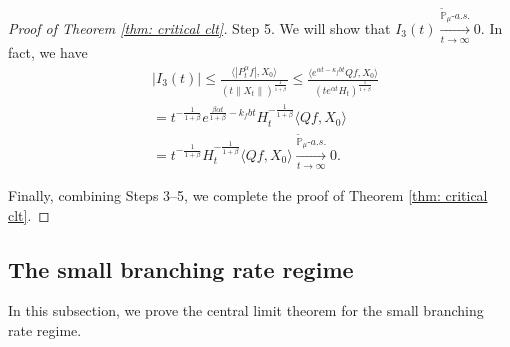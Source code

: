 \documentclass[12pt,a4paper]{amsart}
\theoremstyle{plain}
\theoremstyle{definition}
\numberwithin{equation}{section}
\begin{document}
\begin{proof}[Proof of Theorem \ref{thm: critical clt}]
	Step 5.
    We will show that $I_3(t) \xrightarrow[t\to \infty]{\widetilde {\mathbb P}_\mu \text{-} a.s.} 0$.
    In fact, we have
\begin{align}
	&|I_3(t)|
\leq \frac{\langle |P^\alpha_tf|,X_0\rangle}{(t\|X_t\|)^{\frac{1}{1+\beta}}}
	\leq \frac{\langle e^{\alpha t - \kappa_f b t}Qf,X_0\rangle}{(te^{\alpha t} H_t)^{\frac{1}{1+\beta}}}
	\\& = t^{-\frac{1}{1+\beta}} e^{\frac{\beta \alpha t}{1+\beta} - k_fbt} H_t^{-\frac{1}{1+\beta}} \langle Qf,X_0\rangle
	\\& = t^{-\frac{1}{1+\beta}} H_t^{-\frac{1}{1+\beta}} \langle Qf,X_0\rangle
	\xrightarrow[t\to \infty]{\widetilde {\mathbb P}_\mu \text{-} a.s.} 0.
\end{align}

	Finally, combining Steps 3--5, we complete the proof of Theorem \ref{thm: critical clt}.
\end{proof}

\subsection{The small branching rate regime}
\label{sec: small rate}

    In this subsection, we prove the central limit theorem for the small branching rate regime.
\end{document}
